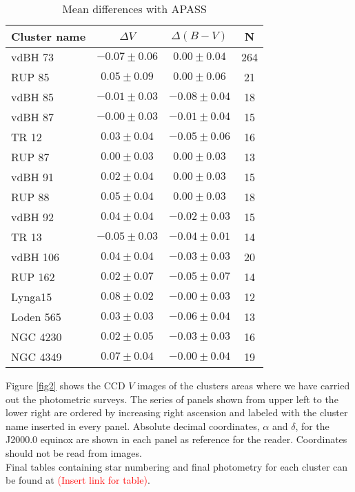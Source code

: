 \documentclass{aa}
\begin{document}
\begin{table}[ht]
    \centering
    \begin{tabular}{lccc}
    \hline
    Cluster name & $\Delta V$ & $\Delta (B-V)$ & N \\
    \hline \hline
    vdBH 73 & $-0.07\pm0.06$ & $0.00\pm0.04$ & 264\\
    RUP 85 & $0.05\pm0.09$ & $0.00\pm0.06$ & 21\\
    vdBH 85 & $-0.01\pm0.03$ & $-0.08\pm0.04$ & 18\\
    vdBH 87 & $-0.00\pm0.03$ & $-0.01\pm0.04$ & 15\\
    TR 12 & $0.03\pm0.04$ & $-0.05\pm0.06$ & 16\\
    RUP 87 & $0.00\pm0.03$ & $0.00\pm0.03$ & 13\\
    vdBH 91 & $0.02\pm0.04$ & $0.00\pm0.03$ & 15\\
    RUP 88 & $0.05\pm0.04$ & $0.00\pm0.03$ & 18\\
    vdBH 92 & $0.04\pm0.04$ & $-0.02\pm0.03$ & 15\\
    TR 13 & $-0.05\pm0.03$ & $-0.04\pm0.01$ & 14\\
    vdBH 106 & $0.04\pm0.04$ & $-0.03\pm0.03$ & 20\\
    RUP 162 & $0.02\pm0.07$ & $-0.05\pm0.07$ & 14\\
    Lynga15 & $0.08\pm0.02$ & $-0.00\pm0.03$ & 12\\
    Loden 565 & $0.03\pm0.03$ & $-0.06\pm0.04$ & 13\\
    NGC 4230 & $0.02\pm0.05$ & $-0.03\pm0.03$ & 16\\
    NGC 4349 & $0.07\pm0.04$ & $-0.00\pm0.04$ & 19\\
    \hline
    \end{tabular}
    \caption{Mean differences with APASS}
    \label{tab:apass_diffs}
\end{table}

Figure \ref{fig2} shows the CCD $V$ images of the clusters areas where we have
carried out the photometric surveys. The series of panels shown from upper left
to the lower right are ordered by increasing right ascension and labeled with
the cluster name inserted in every panel. Absolute decimal
coordinates, $\alpha$ and $\delta$, for the J2000.0 equinox are shown in each
panel as reference for the reader. Coordinates should not be read from images.\\

Final tables containing star numbering and final photometry for each cluster can
be found at \textcolor{red}{(Insert link for table)}.
\end{document}
